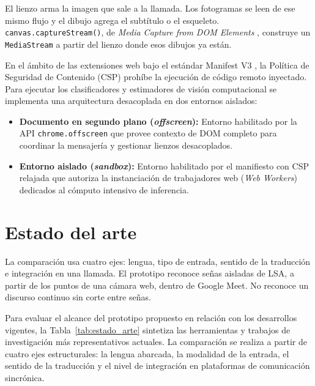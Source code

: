 El lienzo arma la imagen que sale a la llamada. Los fotogramas se leen de ese mismo flujo y el dibujo agrega el subtítulo o el esqueleto. \texttt{canvas.captureStream()}, de \textit{Media Capture from DOM Elements} \parencite{w3c2024mediacapture}, construye un \texttt{MediaStream} a partir del lienzo donde esos dibujos ya están.

En el ámbito de las extensiones web bajo el estándar Manifest V3 \parencite{chrome2024manifestv3}, la Política de Seguridad de Contenido (CSP) prohíbe la ejecución de código remoto inyectado. Para ejecutar los clasificadores y estimadores de visión computacional se implementa una arquitectura desacoplada en dos entornos aislados:
\begin{itemize}
    \item \textbf{Documento en segundo plano (\textit{offscreen}):} Entorno habilitado por la API \texttt{chrome.offscreen} \parencite{chrome2024offscreen} que provee contexto de DOM completo para coordinar la mensajería y gestionar lienzos desacoplados.
    \item \textbf{Entorno aislado (\textit{sandbox}):} Entorno habilitado por el manifiesto \parencite{chrome2024sandbox} con CSP relajada que autoriza la instanciación de trabajadores web (\textit{Web Workers}) dedicados al cómputo intensivo de inferencia.
\end{itemize}

\section{Estado del arte}
\label{sec:estado_del_arte}
La comparación usa cuatro ejes: lengua, tipo de entrada, sentido de la traducción e integración en una llamada. El prototipo reconoce señas aisladas de LSA, a partir de los puntos de una cámara web, dentro de Google Meet. No reconoce un discurso continuo sin corte entre señas.

Para evaluar el alcance del prototipo propuesto en relación con los desarrollos vigentes, la Tabla~\ref{tab:estado_arte} sintetiza las herramientas y trabajos de investigación más representativos actuales. La comparación se realiza a partir de cuatro ejes estructurales: la lengua abarcada, la modalidad de la entrada, el sentido de la traducción y el nivel de integración en plataformas de comunicación sincrónica.

